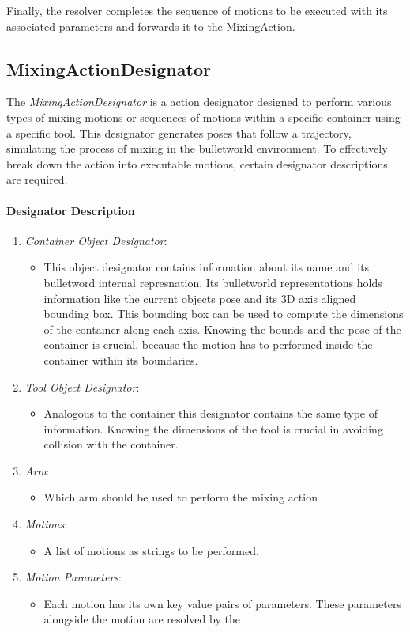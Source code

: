 Finally, the resolver completes the sequence of motions to be executed with its associated parameters and 
forwards it to the MixingAction.

\subsection{MixingActionDesignator}
The \textit{MixingActionDesignator} is a action designator 
designed to perform various types of mixing motions or sequences of motions within a specific container using a specific tool. 
This designator generates poses that follow a trajectory, simulating the process of mixing in the bulletworld environment.
To effectively break down the action into executable motions, certain designator descriptions are required.


\paragraph{Designator Description}
\begin{enumerate}
    \item \textit{Container Object Designator}:
    \begin{itemize}
        \item This object designator contains information about its name and its bulletword internal represnation.
            Its bulletworld representations holds information like the current objects pose and its 3D axis aligned bounding box.
            This bounding box can be used to compute the dimensions of the container along each axis. 
            Knowing the bounds and the pose of the container is crucial, because the motion has to performed inside 
            the container within its boundaries.
    \end{itemize}
    \item \textit{Tool Object Designator}:
    \begin{itemize}
        \item Analogous to the container this designator contains the same type of information.
        Knowing the dimensions of the tool is crucial in avoiding collision with the container.
    \end{itemize}
    \item \textit{Arm}:
    \begin{itemize}
        \item Which arm should be used to perform the mixing action
    \end{itemize}
    \item \textit{Motions}:
    \begin{itemize}
        \item A list of motions as strings to be performed. 
    \end{itemize}
    \item \textit{Motion Parameters}:
    \begin{itemize}
        \item Each motion has its own key value pairs of parameters.
        These parameters alongside the motion are resolved by the 
    \end{itemize}
\end{enumerate}

